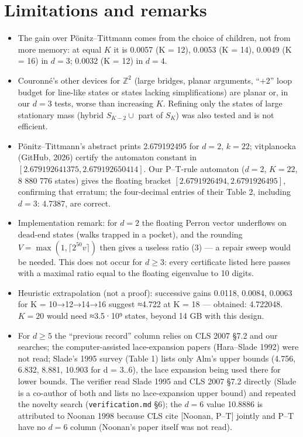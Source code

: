 \documentclass[11pt,a4paper]{report}
\begin{document}
\section{Limitations and remarks}

\begin{itemize}
\tightlist
\item
  The gain over Pönitz--Tittmann comes from the choice of children, not from more memory: at equal \(K\) it is
  0.0057 (K = 12), 0.0053 (K = 14), 0.0049 (K = 16) in \(d=3\); 0.0032 (K = 12) in \(d=4\).
\item
  Couronné's other devices for \(\mathbb Z^2\) (large bridges, planar arguments, ``+2'' loop budget for line-like states
  or states lacking simplifications) are planar or, in our \(d=3\) tests, worse than increasing \(K\). Refining only
  the states of large stationary mass (hybrid \(S_{K-2}\cup\) part of \(S_K\)) was also tested and is not efficient.
\item
  Pönitz--Tittmann's abstract prints 2.679192495 for \(d=2\), \(k=22\); vitplanocka (GitHub, 2026) certify the
  automaton constant in \([2.679192641375,2.679192650414]\). Our P--T-rule automaton (\(d=2\), \(K=22\), 8 880 776
  states) gives the floating bracket \([2.6791926494,2.6791926495]\), confirming that erratum; the four-decimal
  entries of their Table 2, including \(d=3\): 4.7387, are correct.
\item
  Implementation remark: for \(d=2\) the floating Perron vector underflows on dead-end states (walks trapped in a
  pocket), and the rounding \(V=\max(1,\lceil2^{50}v\rceil)\) then gives a useless ratio (3) --- a repair sweep would
  be needed. This does not occur for \(d\ge3\): every certificate listed here passes with a maximal ratio equal to
  the floating eigenvalue to 10 digits.
\item
  Heuristic extrapolation (not a proof): successive gains 0.0118, 0.0084, 0.0063 for K = 10→12→14→16 suggest
  ≈4.722 at K = 18 --- obtained: 4.722048. \(K=20\) would need ≈3.5·10⁹ states, beyond 14 GB with this design.
\item
  For \(d\ge5\) the ``previous record'' column relies on CLS 2007 §7.2 and our searches; the computer-assisted
  lace-expansion papers (Hara--Slade 1992) were not read; Slade's 1995 survey (Table 1) lists only Alm's upper bounds
  (4.756, 6.832, 8.881, 10.903 for d = 3..6), the lace expansion being used there for lower bounds. The verifier read Slade 1995 and CLS 2007 §7.2 directly (Slade is a co-author of both and lists no lace-expansion upper
  bound) and repeated the novelty search (\texttt{verification.md} §6); the \(d=6\) value 10.8886 is attributed to
  Noonan 1998 because CLS cite [Noonan, P--T] jointly and P--T have no \(d=6\) column (Noonan's paper itself was not
  read).
\end{itemize}
\end{document}
